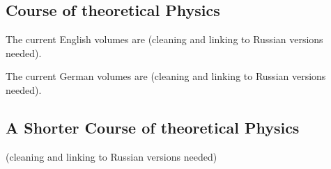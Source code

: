 \documentclass[a4paper]{article}
\begin{document}
\subsection{Course of theoretical Physics}

The current English volumes are
\cite{Landau_1986a,Landau_1975a,Landau_1980a,Landau_1980b,Lifshitz_1980a,%
Landau_1977a,Berestetskii_1982a,Lifshitz_1981a,Landau_1976a,Landau_1987a,%
Landau_1984a} (cleaning and linking to Russian versions needed).

The current German volumes are
\cite{Landau_1997,Landau_1992,Landau_2012,Landau1991,Landau_1987,Landau_1991a,%
Landau_1991,Landau_1990,Landau1992,Landau1990} (cleaning and linking to Russian
versions needed).

\subsection{A Shorter Course of theoretical Physics}

\cite{Landau_1974a,Landau_1972a} (cleaning and linking to Russian versions needed)

\printbibliography
\end{document}
